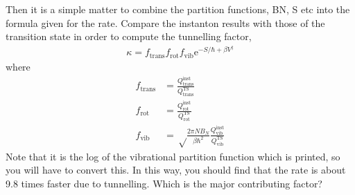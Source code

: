 \documentclass{article}
\begin{document}
\begin{Exercise}[label={post},title={Postprocessing for the rate calculation}]
Then it is a simple matter to combine the partition functions, BN, S etc into the formula given for the rate.
Compare the instanton results with those of the transition state in order to compute the tunnelling factor,
\begin{align}
	\kappa = 
		f_\text{trans} f_\text{rot} f_\text{vib}
		\mathrm{e}^{-S/\hbar+\beta V^\ddag}
\end{align}
where
\begin{align}
	f_\text{trans} &= \frac{Q_\text{trans}^\text{inst}}{Q_\text{trans}^\text{TS}} \\
	f_\text{rot} &= \frac{Q_\text{rot}^\text{inst}}{Q_\text{rot}^\text{TS}} \\
	f_\text{vib} &= \sqrt\frac{2\pi NB_N}{\beta \hbar^2} \frac{Q_\text{vib}^\text{inst}}{Q_\text{vib}^\text{TS}}
\end{align}
Note that it is the log of the vibrational partition function which is printed, so you will have to convert this. 
In this way, you should find that the rate is about 9.8 times faster due to tunnelling.
Which is the major contributing factor?

\end{Exercise}




\end{document}

